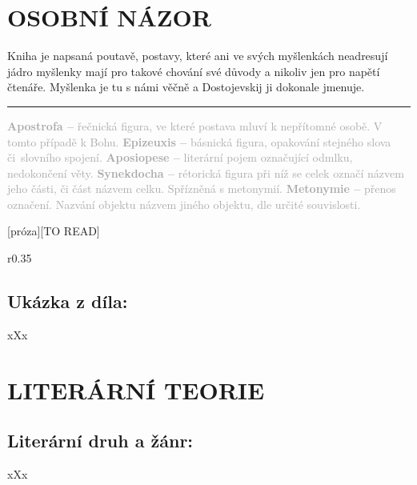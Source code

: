 \documentclass{extarticle} %
\begin{document}
\section*{OSOBNÍ NÁZOR}
\noindent 
Kniha je napsaná poutavě, postavy, které ani ve svých myšlenkách neadresují jádro myšlenky mají pro  takové chování své důvody a nikoliv jen pro napětí čtenáře. Myšlenka je tu s námi věčně a Dostojevskij ji dokonale jmenuje.

\vfill

\noindent\begin{minipage}{\textwidth}
    \textcolor{darkgray}{\rule{\linewidth}{0.4pt}
    \footnotesize
    \textbf{Apostrofa --} řečnická figura, ve které postava mluví k nepřítomné osobě. V tomto případě k Bohu.
    \textbf{Epizeuxis --} básnická figura, opakování stejného slova či~slovního spojení. 
    \textbf{Aposiopese --} literární pojem označující odmlku, nedokončení věty.
    \textbf{Synekdocha --} rétorická figura při níž se celek označí názvem jeho části, či část názvem celku. Spřízněná s metonymií.
    \textbf{Metonymie --} přenos označení. Nazvání objektu názvem jiného objektu, dle určité souvislosti.
    }
\end{minipage}

\newpage


\changefontsize{8pt}

[próza][TO READ]

\noindent\begin{wrapfigure}{r}{0.35\textwidth}
\tiny

\subsection*{Ukázka z díla:}
\setlength{\parindent}{3pt}
xXx
\end{wrapfigure}

\section*{LITERÁRNÍ TEORIE}

\subsection*{Literární druh a žánr:}
\noindent xXx

\end{document}
